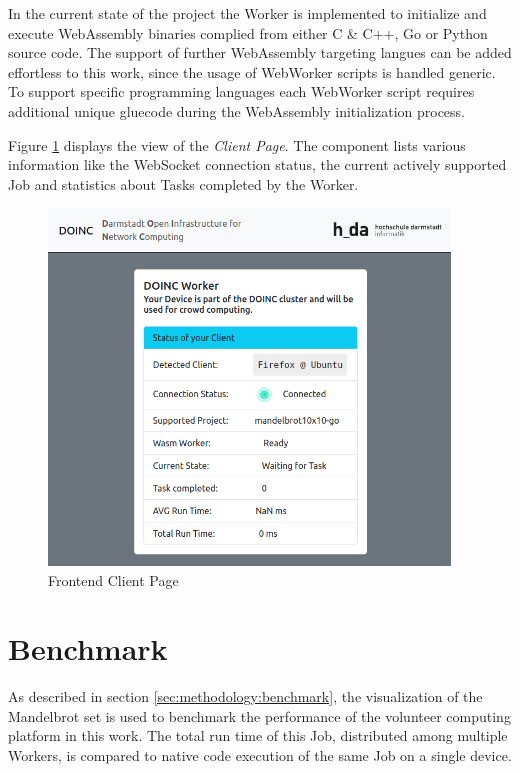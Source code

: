 In the current state of the project the Worker is implemented to initialize and execute WebAssembly binaries complied from either C \& C++, Go or Python source code. The support of further WebAssembly targeting langues can be added effortless to this work, since the usage of WebWorker scripts is handled generic. To support specific programming languages each WebWorker script requires additional unique gluecode during the WebAssembly initialization process.

Figure \ref{fig:implementation:client-page} displays the view of the \emph{Client Page}. The component lists various information like the WebSocket connection status, the current actively supported Job and statistics about Tasks completed by the Worker.
\clearpage
\begin{figure}[htbp]
    \centering
    \includegraphics[width=0.95\textwidth]{gfx/figures/client-page.png}
    \caption{Frontend Client Page}
    \label{fig:implementation:client-page}
\end{figure}

\section{Benchmark}
\label{sec:implementation:benchmark}
As described in section \ref{sec:methodology:benchmark}, the visualization of the Mandelbrot set is used to benchmark the performance of the volunteer computing platform in this work. The total run time of this Job, distributed among multiple Workers, is compared to native code execution of the same Job on a single device.

